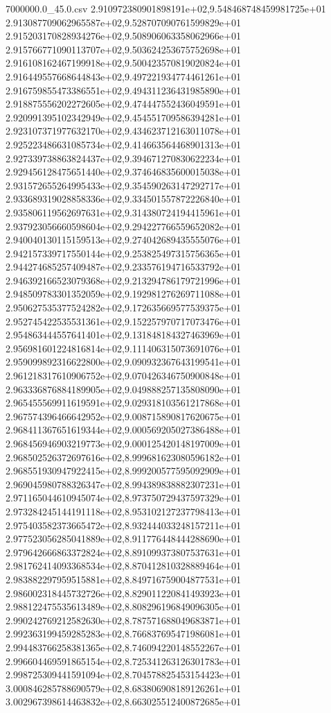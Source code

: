 \begin{filecontents*}{7000000.0_45.0.csv}
2.910972380901898191e+02,9.548468748459981725e+01
2.913087709062965587e+02,9.528707090761599829e+01
2.915203170828934276e+02,9.508906063358062966e+01
2.915766771090113707e+02,9.503624253675752698e+01
2.916108162467199918e+02,9.500423570819020824e+01
2.916449557668644843e+02,9.497221934774461261e+01
2.916759855473386551e+02,9.494311236431985890e+01
2.918875556202272605e+02,9.474447552436049591e+01
2.920991395102342949e+02,9.454551709586394281e+01
2.923107371977632170e+02,9.434623712163011078e+01
2.925223486631085734e+02,9.414663564468901313e+01
2.927339738863824437e+02,9.394671270830622234e+01
2.929456128475651440e+02,9.374646835600015038e+01
2.931572655264995433e+02,9.354590263147292717e+01
2.933689319028858336e+02,9.334501557872226840e+01
2.935806119562697631e+02,9.314380724194415961e+01
2.937923056660598604e+02,9.294227766559652082e+01
2.940040130115159513e+02,9.274042689435555076e+01
2.942157339717550144e+02,9.253825497315756365e+01
2.944274685257409487e+02,9.233576194716533792e+01
2.946392166523079368e+02,9.213294786179721996e+01
2.948509783301352059e+02,9.192981276269711088e+01
2.950627535377524282e+02,9.172635669577539375e+01
2.952745422535531361e+02,9.152257970717073476e+01
2.954863444557641401e+02,9.131848184327463969e+01
2.956981601224816814e+02,9.111406315073691076e+01
2.959099892316622800e+02,9.090932367643199541e+01
2.961218317610906752e+02,9.070426346750900848e+01
2.963336876884189905e+02,9.049888257135808090e+01
2.965455569911619591e+02,9.029318103561217868e+01
2.967574396466642952e+02,9.008715890817620675e+01
2.968411367651619344e+02,9.000569205027386488e+01
2.968456946903219773e+02,9.000125420148197009e+01
2.968502526372697616e+02,8.999681623080596182e+01
2.968551930947922415e+02,8.999200577595092909e+01
2.969045980788326347e+02,8.994389838882307231e+01
2.971165044610945074e+02,8.973750729437597329e+01
2.973284245144191118e+02,8.953102127237798413e+01
2.975403582373665472e+02,8.932444033248157211e+01
2.977523056285041889e+02,8.911776448444288690e+01
2.979642666863372824e+02,8.891099373807537631e+01
2.981762414093368534e+02,8.870412810328889464e+01
2.983882297959515881e+02,8.849716759004877531e+01
2.986002318445732726e+02,8.829011220841493923e+01
2.988122475535613489e+02,8.808296196849096305e+01
2.990242769212582630e+02,8.787571688049683871e+01
2.992363199459285283e+02,8.766837695471986081e+01
2.994483766258381365e+02,8.746094220148552267e+01
2.996604469591865154e+02,8.725341263126301783e+01
2.998725309441591094e+02,8.704578825453154423e+01
3.000846285788690579e+02,8.683806908189126261e+01
3.002967398614463832e+02,8.663025512400872685e+01

\end{filecontents*}
